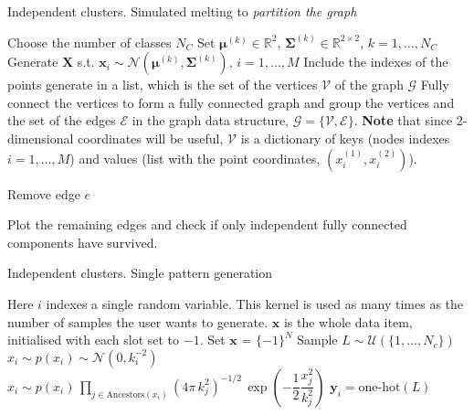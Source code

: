 \documentclass[a4paper,12pt]{article}
\begin{document}
\begin{algorithm}
	\begin{algorithmic}[1]
		\caption{Independent clusters. Simulated melting to \textit{partition the graph}}
		
		\State Choose the number of classes $N_C$
		\State Set $\bm{\mu}^{(k)} \in \mathbb{R}^2$, $\bm{\Sigma}^{(k)} \in \mathbb{R}^{2\times2}$, $k = 1, \dots, N_C$
		\State Generate $\bm{X}$ s.t. $\bm{x}_i \sim \mathcal{N}(\bm{\mu}^{(k)}, \bm{\Sigma}^{(k)})$, $i = 1, \dots, M$
		\State Include the indexes of the points generate in a list, which is the set of the vertices $\mathcal{V}$ of the graph $\mathcal{G}$
		\State Fully connect the vertices to form a fully connected graph and group the vertices and the set of the edges $\mathcal{E}$ in the graph data structure, $\mathcal{G} = \{\mathcal{V}, \mathcal{E}\}$. \textbf{Note} that since 2-dimensional coordinates will be useful, $\mathcal{V}$ is a dictionary of keys (nodes indexes $i = 1, \dots, M$) and values (list with the point coordinates, $(x_i^{(1)}, x_i^{(2)})$).
		
		
		
		
		\State Remove edge $e$
		\EndIf
		\EndFor
		\EndFor
		
		\State Plot the remaining edges and check if only independent fully connected components have survived.
		\label{alg:simulatedmelting}
	\end{algorithmic}
\end{algorithm}


\begin{algorithm}
	\begin{algorithmic}[1]
		\caption{Independent clusters. Single pattern generation}
		\State Here $i$ indexes a single random variable. This kernel is used as many times as the number of samples the user wants to generate. $\bm{x}$ is the whole data item, initialised with each slot set to $-1$.
		\State Set $\bm{x}$ = $\{-1\}^N$
		\State Sample $L \sim \mathcal{U}(\{ 1, \dots, N_c\})$
				\State $x_i \sim p(x_i) \sim \mathcal{N}(0, k_i^{-2})$
			\Else
				\State $x_i \sim p(x_i) \, \prod_{j \in \text{Ancestors}(x_i)} (4\pi \, k_j^2)^{-1/2}\, \exp \left(-\dfrac{1}{2} \dfrac{x_j^2}{k_j^2} \right)$ 
			\EndIf
		\EndFor
		\State $\bm{y}_i = \text{one-hot}(L)$
		
		\label{alg:clus_spg}
	\end{algorithmic}
\end{algorithm}
\end{document}
